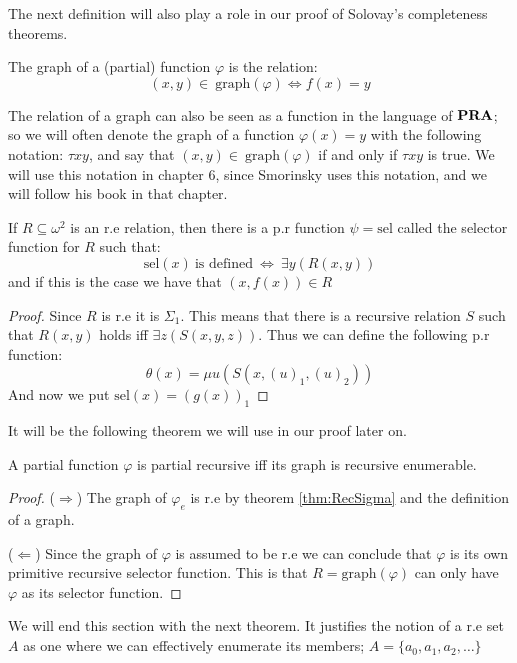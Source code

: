 \documentclass[../main.tex]{subfiles}
\begin{document}
The next definition will also play a role in our proof of Solovay's
completeness theorems.

\begin{defi}
	The graph of a (partial) function $\varphi$ is the relation:
	\[(x,y)\in\ \text{graph} (\varphi)\Leftrightarrow f(x)=y\]
\end{defi}
The relation of a graph can also be seen as a function in the language of
$\text{\textbf{PRA}}$; so we will often denote the graph of a function $\varphi(x)=y$ with the
following notation: $\tau xy$, and say that $(x,y)\in\ \text{graph}(\varphi)$ if and
only if $\tau xy$ is true. We will use this notation in chapter 6, since Smorinsky
uses this notation, and we will follow his book \citet{Smor1985} in that
chapter.

\begin{thm}
	If $R\subseteq\omega^2$ is an r.e relation, then there is a p.r
	function $\psi=\text{sel}$ called the selector function for $R$ such that:
	$$\text{sel}(x)\ \text{is defined}\ \Leftrightarrow\ \exists y(R(x,y))$$
	and if this is the case we have that $(x,f(x))\in R$
\end{thm}
\begin{proof}
	Since $R$ is r.e it is $\Sigma_1$. This means that there is a recursive
	relation $S$ such that $R(x,y)$ holds iff $\exists z (S(x,y,z))$. Thus
	we can define the following p.r function:
	$$\theta(x)=\mu u(S(x,(u)_1,(u)_2))$$
	And now we put $\text{sel}(x)=(g(x))_1$
\end{proof}
It will be the following theorem we will use in our proof later on.
\begin{thm}
	A partial function $\varphi$ is partial recursive iff its graph is recursive
	enumerable.
\end{thm}
\begin{proof}
	($\Rightarrow$) The graph of $\varphi_e$ is r.e by theorem \ref{thm:RecSigma} and the
	definition of a graph.

	($\Leftarrow$) Since the graph of $\varphi$ is assumed to be r.e we can
	conclude that $\varphi$ is its own primitive recursive selector function. This
	is that $R=\text{graph} (\varphi)$ can only have $\varphi$ as its selector function.
\end{proof}

We will end this section with the next theorem. It justifies the notion of a
r.e set $A$ as one where we can effectively enumerate its members;
$A=\{a_0,a_1,a_2,\ldots\}$
\end{document}
